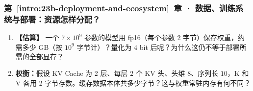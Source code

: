 \subsubsection*{第~\ref*{intro:23b-deployment-and-ecosystem}~章 · 数据、训练系统与部署：资源怎样分配？}
\begin{enumerate}[label={},leftmargin=4.8em,itemsep=4pt]
\item[\textbf{C-113.}] \leavevmode{}\label{exercise:C-113}\label{exercise:weight-memory-budget}\textbf{【估算】} 一个 $7\times10^9$ 参数的模型用 fp16（每个参数 2 字节）保存权重，约需多少 GB（按 $10^9$ 字节计）？量化为 4 bit 后呢？为什么这仍不等于部署所需的全部显存？
\item[\textbf{C-114.}] \leavevmode{}\label{exercise:C-114}\label{exercise:kv-cache-bytes}\textbf{权衡：}假设 KV Cache 为 $2$ 层、每层 $2$ 个 KV 头、头维 $8$、序列长 $10$，K 和 V 各用 2 字节存数。缓存数据本体共多少字节？这与权重常驻内存有何不同？
\end{enumerate}
